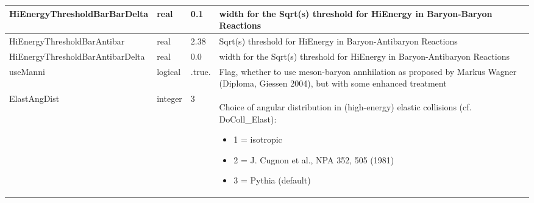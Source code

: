 \documentclass{article}
\begin{document}
\begin{longtable}{llll}
\midrule
HiEnergyThresholdBarBarDelta & \begin{minipage}[t]{2cm}real\end{minipage} & \begin{minipage}[t]{2cm}0.1\end{minipage} & \begin{minipage}[t]{12cm}width for the Sqrt(s) threshold for HiEnergy in Baryon-Baryon Reactions\end{minipage}\\*
\midrule
HiEnergyThresholdBarAntibar & \begin{minipage}[t]{2cm}real\end{minipage} & \begin{minipage}[t]{2cm}2.38\end{minipage} & \begin{minipage}[t]{12cm}Sqrt(s) threshold for HiEnergy in Baryon-Antibaryon Reactions\end{minipage}\\*
\midrule
HiEnergyThresholdBarAntibarDelta & \begin{minipage}[t]{2cm}real\end{minipage} & \begin{minipage}[t]{2cm}0.0\end{minipage} & \begin{minipage}[t]{12cm}width for the Sqrt(s) threshold for HiEnergy in Baryon-Antibaryon Reactions\end{minipage}\\*
\midrule
useManni & \begin{minipage}[t]{2cm}logical\end{minipage} & \begin{minipage}[t]{2cm}.true.\end{minipage} & \begin{minipage}[t]{12cm}Flag, whether to use meson-baryon annhilation as proposed by Markus Wagner (Diploma, Giessen 2004), but with some enhanced treatment\end{minipage}\\*
\midrule
ElastAngDist & \begin{minipage}[t]{2cm}integer\end{minipage} & \begin{minipage}[t]{2cm}3\end{minipage} & \begin{minipage}[t]{12cm}Choice of angular distribution in (high-energy) elastic collisions (cf. DoColl\_Elast):\begin{itemize}\leftmargin0em\itemindent0pt\item 1 = isotropic\item 2 = J. Cugnon et al., NPA 352, 505 (1981)\item 3 = Pythia (default)\end{itemize}\end{minipage}\\*

\end{longtable}
\end{document}

